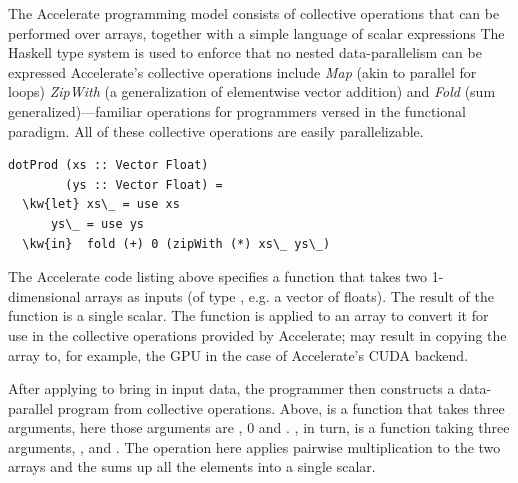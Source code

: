 The Accelerate programming model consists of collective 
operations that can be performed over arrays, together with a simple 
language of scalar expressions
The Haskell type 
system is used to enforce that no nested data-parallelism can be expressed 
\fi{}
Accelerate's collective operations include {\em Map} (akin to parallel
for loops) {\em ZipWith} (a generalization of elementwise vector addition) and 
{\em Fold} (sum generalized)---familiar operations for programmers versed in the functional paradigm.
All of these collective operations are easily parallelizable. 

\begin{Verbatim}[commandchars=\\\{\}]
dotProd (xs :: Vector Float) 
        (ys :: Vector Float) = 
  \kw{let} xs\_ = use xs 
      ys\_ = use ys 
  \kw{in}  fold (+) 0 (zipWith (*) xs\_ ys\_) 
\end{Verbatim}

The Accelerate code listing above specifies a function that takes two 1-dimensional 
arrays as inputs (of type , e.g. a vector of floats). The result of the function is a single
scalar. 
The  function is applied to an array to convert it 
for use in the collective operations provided by Accelerate;
may result in
copying the array to, for example, the GPU in the case of Accelerate's 
CUDA backend.  

After applying  to bring in input data, the programmer then
constructs a data-parallel program from collective operations.
Above,  is a function that takes three arguments, 
here those arguments are \cde{(+)},  $0$ and . 
, in turn, is a function taking three arguments, \cde{(*)}, 
 and . The  operation here applies pairwise 
multiplication to the two arrays and the  sums up all the elements 
into a single scalar. 

